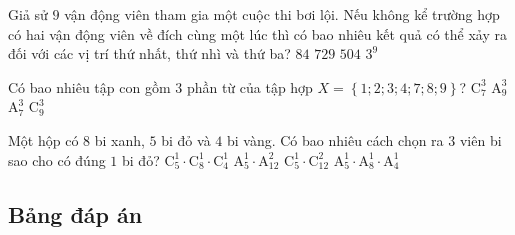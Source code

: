 \begin{ex}%
	Giả sử $9$ vận động viên tham gia một cuộc thi bơi lội. Nếu không kể trường hợp có hai vận động viên về đích cùng một lúc thì có bao nhiêu kết quả có thể xảy ra đối với các vị trí thứ nhất, thứ nhì và thứ ba?
	\choice
	{$84$}
	{$729$}
	{\True $504$}
	{$3^9$}
\end{ex}
\begin{ex}%
	Có bao nhiêu tập con gồm $3$ phần từ của tập hợp $X=\left\{1;2;3;4;7;8;9\right\}$?
	\choice
	{\True $\mathrm{C}^3_7$}
	{$\mathrm{A}^3_9$}
	{$\mathrm{A}^3_7$}
	{$\mathrm{C}^3_9$}
\end{ex}
\begin{ex}%
Một hộp có $8$ bi xanh, $5$ bi đỏ và $4$ bi vàng. Có bao nhiêu cách chọn ra $3$ viên bi sao cho có đúng $1$ bi đỏ?
	\choice
	{$\mathrm{C}^1_5\cdot \mathrm{C}^1_8\cdot \mathrm{C}^1_4$}
	{$\mathrm{A}^1_5\cdot \mathrm{A}^2_{12}$}
	{\True $\mathrm{C}^1_5\cdot \mathrm{C}^2_{12}$}
	{$\mathrm{A}^1_5\cdot \mathrm{A}^1_8\cdot \mathrm{A}^1_4$}
\end{ex}
\subsection{Bảng đáp án}

